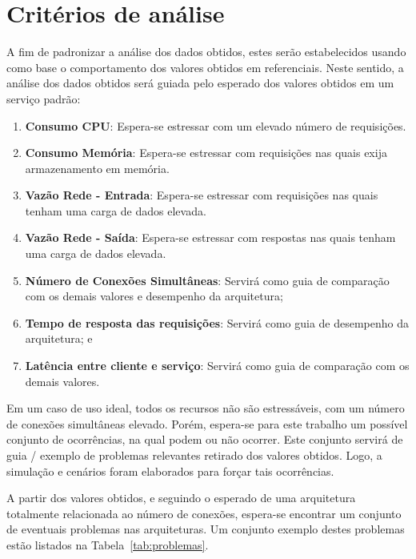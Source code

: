 \section{Critérios de análise}
\label{sec:criterios}

A fim de padronizar a análise dos dados obtidos, estes serão estabelecidos usando como base o comportamento dos valores obtidos em referenciais.
%
Neste sentido, a análise dos dados obtidos será guiada pelo esperado dos valores obtidos em um serviço padrão:

\begin{enumerate}
  \item \textbf{Consumo CPU}: Espera-se estressar com um elevado número de requisições.
  \item \textbf{Consumo Memória}: Espera-se estressar com requisições nas quais exija armazenamento em memória.
  \item \textbf{Vazão Rede - Entrada}: Espera-se estressar com requisições nas quais tenham uma carga de dados elevada.
  \item \textbf{Vazão Rede - Saída}: Espera-se estressar com respostas nas quais tenham uma carga de dados elevada.
  \item \textbf{Número de Conexões Simultâneas}: Servirá como guia de comparação com os demais valores e desempenho da arquitetura;
  \item \textbf{Tempo de resposta das requisições}: Servirá como guia de desempenho da arquitetura; e
  \item \textbf{Latência entre cliente e serviço}: Servirá como guia de comparação com os demais valores.
\end{enumerate}

Em um caso de uso ideal, todos os recursos não são estressáveis, com um número de conexões simultâneas elevado.
%
Porém, espera-se para este trabalho um possível conjunto de ocorrências, na qual podem ou não ocorrer.
%
Este conjunto servirá de guia / exemplo de problemas relevantes retirado dos valores obtidos.
%
Logo, a simulação e cenários foram elaborados para forçar tais ocorrências.


A partir dos valores obtidos, e seguindo o esperado de uma arquitetura totalmente relacionada ao número de conexões, espera-se encontrar um conjunto de eventuais problemas nas arquiteturas.
%
Um conjunto exemplo destes problemas estão listados na Tabela~\ref{tab:problemas}.
\pagebreak

